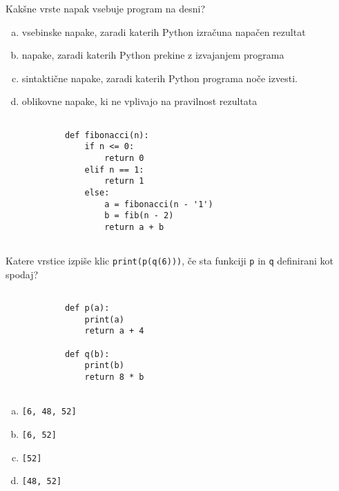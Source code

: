 \documentclass[arhiv, 10pt]{../izpit}
\newcommand{\inlinepy}[1]{\texttt{#1}}
\begin{document}
        \naloga*
        \begin{multicols}{2}
        \noindent
        Kakšne vrste napak vsebuje program na desni?

        \begin{enumerate}[(a)]
\item vsebinske napake, zaradi katerih Python izračuna napačen rezultat
\item napake, zaradi katerih Python prekine z izvajanjem programa
\item sintaktične napake, zaradi katerih Python programa noče izvesti.
\item oblikovne napake, ki ne vplivajo na pravilnost rezultata
\end{enumerate}

        \columnbreak

        \begin{verbatim}
        
            def fibonacci(n):
                if n <= 0:
                    return 0
                elif n == 1:
                    return 1
                else:
                    a = fibonacci(n - '1')
                    b = fib(n - 2)
                    return a + b
            
        \end{verbatim}

        \end{multicols}

    
        \naloga*
        Katere vrstice izpiše klic \inlinepy{print(p(q(6)))}, če sta funkciji \inlinepy{p} in \inlinepy{q} definirani kot spodaj?

        \begin{multicols}{2}
        \begin{verbatim}
        
            def p(a):
                print(a)
                return a + 4

            def q(b):
                print(b)
                return 8 * b
        
        \end{verbatim}

        \begin{enumerate}[(a)]
\item \inlinepy{[6, 48, 52]}
\item \inlinepy{[6, 52]}
\item \inlinepy{[52]}
\item \inlinepy{[48, 52]}
\end{enumerate}

        \end{multicols}
    
\end{document}
